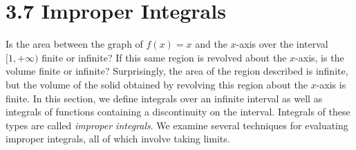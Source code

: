 \documentclass{report}
\begin{document}
        \pagebreak 
        \section*{3.7 Improper Integrals}
        \bigbreak \noindent 
        Is the area between the graph of \( f(x) = x \) and the \( x \)-axis over the interval \([1,+\infty)\) finite or infinite? If this same region is revolved about the \( x \)-axis, is the volume finite or infinite? Surprisingly, the area of the region described is infinite, but the volume of the solid obtained by revolving this region about the \( x \)-axis is finite.
        \bigbreak \noindent 
        In this section, we define integrals over an infinite interval as well as integrals of functions containing a discontinuity on the interval. Integrals of these types are called \textit{improper integrals}. We examine several techniques for evaluating improper integrals, all of which involve taking limits.
        \smallbreak \noindent
\end{document}

